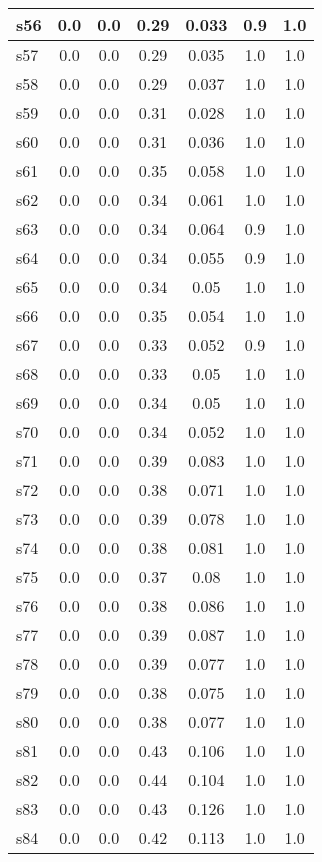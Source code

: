 \documentclass{article}
\begin{document}
\begin{tabular}{|l|c|c|c|c|c|c|}
\hline
s56 &0.0 & 0.0 & 0.29 & 0.033 & 0.9 & 1.0\\
\hline
s57 &0.0 & 0.0 & 0.29 & 0.035 & 1.0 & 1.0\\
\hline
s58 &0.0 & 0.0 & 0.29 & 0.037 & 1.0 & 1.0\\
\hline
s59 &0.0 & 0.0 & 0.31 & 0.028 & 1.0 & 1.0\\
\hline
s60 &0.0 & 0.0 & 0.31 & 0.036 & 1.0 & 1.0\\
\hline
s61 &0.0 & 0.0 & 0.35 & 0.058 & 1.0 & 1.0\\
\hline
s62 &0.0 & 0.0 & 0.34 & 0.061 & 1.0 & 1.0\\
\hline
s63 &0.0 & 0.0 & 0.34 & 0.064 & 0.9 & 1.0\\
\hline
s64 &0.0 & 0.0 & 0.34 & 0.055 & 0.9 & 1.0\\
\hline
s65 &0.0 & 0.0 & 0.34 & 0.05 & 1.0 & 1.0\\
\hline
s66 &0.0 & 0.0 & 0.35 & 0.054 & 1.0 & 1.0\\
\hline
s67 &0.0 & 0.0 & 0.33 & 0.052 & 0.9 & 1.0\\
\hline
s68 &0.0 & 0.0 & 0.33 & 0.05 & 1.0 & 1.0\\
\hline
s69 &0.0 & 0.0 & 0.34 & 0.05 & 1.0 & 1.0\\
\hline
s70 &0.0 & 0.0 & 0.34 & 0.052 & 1.0 & 1.0\\
\hline
s71 &0.0 & 0.0 & 0.39 & 0.083 & 1.0 & 1.0\\
\hline
s72 &0.0 & 0.0 & 0.38 & 0.071 & 1.0 & 1.0\\
\hline
s73 &0.0 & 0.0 & 0.39 & 0.078 & 1.0 & 1.0\\
\hline
s74 &0.0 & 0.0 & 0.38 & 0.081 & 1.0 & 1.0\\
\hline
s75 &0.0 & 0.0 & 0.37 & 0.08 & 1.0 & 1.0\\
\hline
s76 &0.0 & 0.0 & 0.38 & 0.086 & 1.0 & 1.0\\
\hline
s77 &0.0 & 0.0 & 0.39 & 0.087 & 1.0 & 1.0\\
\hline
s78 &0.0 & 0.0 & 0.39 & 0.077 & 1.0 & 1.0\\
\hline
s79 &0.0 & 0.0 & 0.38 & 0.075 & 1.0 & 1.0\\
\hline
s80 &0.0 & 0.0 & 0.38 & 0.077 & 1.0 & 1.0\\
\hline
s81 &0.0 & 0.0 & 0.43 & 0.106 & 1.0 & 1.0\\
\hline
s82 &0.0 & 0.0 & 0.44 & 0.104 & 1.0 & 1.0\\
\hline
s83 &0.0 & 0.0 & 0.43 & 0.126 & 1.0 & 1.0\\
\hline
s84 &0.0 & 0.0 & 0.42 & 0.113 & 1.0 & 1.0\\

\end{tabular}
\end{document}
